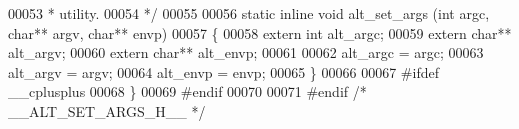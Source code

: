 \begin{DoxyCode}
00053 \textcolor{comment}{ * utility.}
00054 \textcolor{comment}{ */}
00055 
00056 \textcolor{keyword}{static} \textcolor{keyword}{inline} \textcolor{keywordtype}{void} alt_set_args (\textcolor{keywordtype}{int} argc, \textcolor{keywordtype}{char}** argv, \textcolor{keywordtype}{char}** envp)
00057 \{
00058   \textcolor{keyword}{extern} \textcolor{keywordtype}{int}    alt_argc;
00059   \textcolor{keyword}{extern} \textcolor{keywordtype}{char}** alt_argv;
00060   \textcolor{keyword}{extern} \textcolor{keywordtype}{char}** alt_envp;
00061 
00062   alt\_argc = argc;
00063   alt\_argv = argv;
00064   alt\_envp = envp;
00065 \}
00066 
00067 \textcolor{preprocessor}{#ifdef \_\_cplusplus}
00068 \}
00069 \textcolor{preprocessor}{#endif}
00070  
00071 \textcolor{preprocessor}{#endif }\textcolor{comment}{/* \_\_ALT\_SET\_ARGS\_H\_\_ */}\textcolor{preprocessor}{}
\end{DoxyCode}
